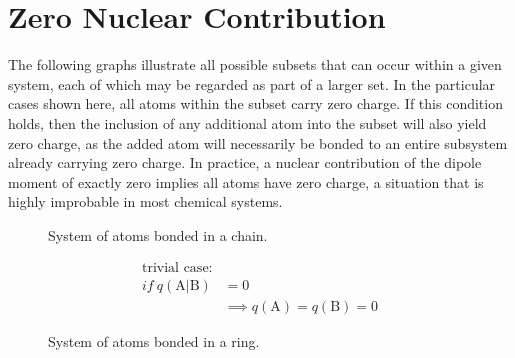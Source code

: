 \newpage
\section{Zero Nuclear Contribution}\label{zero_nuclear_contribution}

The following graphs illustrate all possible subsets that can occur within a
given system, each of which may be regarded as part of a larger set. In the
particular cases shown here, all atoms within the subset carry zero charge.  If
this condition holds, then the inclusion of any additional atom into the subset
will also yield zero charge, as the added atom will necessarily be bonded to an
entire subsystem already carrying zero charge. In practice, a nuclear
contribution of the dipole moment of exactly zero implies all atoms have zero
charge, a situation that is highly improbable in most chemical systems.

\vspace*{1.0cm}%
\begin{figure}[ht]
  \centering
  \scalebox{0.5}{}
  \caption{System of atoms bonded in a chain.}
  \label{first_case}
\end{figure}

\begin{align}
\text{trivial case:} \nonumber\\
  if\: q(\mathrm{A}|\mathrm{B}) &= 0 \nonumber\\
    & \implies q(\mathrm{A}) = q(\mathrm{B}) = 0
\end{align}

\newpage

\vspace*{1.0cm}%
\begin{figure}[ht]
  \centering
  \scalebox{.3}{}
  \caption{System of atoms bonded in a ring.}
  \label{second_case}
\end{figure}

